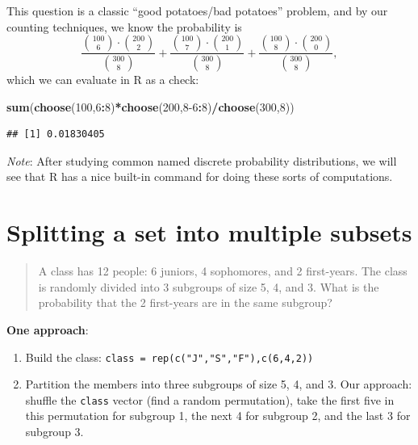 \documentclass[
]{book}
\newenvironment{Shaded}{\begin{snugshade}}{\end{snugshade}}
\newcommand{\DecValTok}[1]{\textcolor[rgb]{0.00,0.00,0.81}{#1}}
\newcommand{\FunctionTok}[1]{\textcolor[rgb]{0.13,0.29,0.53}{\textbf{#1}}}
\newcommand{\NormalTok}[1]{#1}
\newcommand{\SpecialCharTok}[1]{\textcolor[rgb]{0.81,0.36,0.00}{\textbf{#1}}}
\theoremstyle{definition}
\theoremstyle{definition}
\theoremstyle{definition}
\theoremstyle{definition}
\theoremstyle{remark}
\begin{document}
This question is a classic ``good potatoes/bad potatoes'' problem, and by our counting techniques, we know the probability is \[\frac{\binom{100}{6}\cdot\binom{200}{2}}{\binom{300}{8}}+
\frac{\binom{100}{7}\cdot\binom{200}{1}}{\binom{300}{8}}+
\frac{\binom{100}{8}\cdot\binom{200}{0}}{\binom{300}{8}},\]
which we can evaluate in R as a check:

\begin{Shaded}
\begin{Highlighting}[]
\FunctionTok{sum}\NormalTok{(}\FunctionTok{choose}\NormalTok{(}\DecValTok{100}\NormalTok{,}\DecValTok{6}\SpecialCharTok{:}\DecValTok{8}\NormalTok{)}\SpecialCharTok{*}\FunctionTok{choose}\NormalTok{(}\DecValTok{200}\NormalTok{,}\DecValTok{8{-}6}\SpecialCharTok{:}\DecValTok{8}\NormalTok{)}\SpecialCharTok{/}\FunctionTok{choose}\NormalTok{(}\DecValTok{300}\NormalTok{,}\DecValTok{8}\NormalTok{))}
\end{Highlighting}
\end{Shaded}

\begin{verbatim}
## [1] 0.01830405
\end{verbatim}

\emph{Note}: After studying common named discrete probability distributions, we will see that R has a nice built-in command for doing these sorts of computations.

\section{Splitting a set into multiple subsets}\label{partition-set-R}

\begin{quote}
A class has 12 people: 6 juniors, 4 sophomores, and 2 first-years. The class is randomly divided into 3 subgroups of size 5, 4, and 3. What is the probability that the 2 first-years are in the same subgroup?
\end{quote}

\textbf{One approach}:

\begin{enumerate}
\def\labelenumi{\arabic{enumi}.}
\item
  Build the class: \texttt{class\ =\ rep(c("J","S","F"),c(6,4,2))}
\item
  Partition the members into three subgroups of size 5, 4, and 3. Our approach: shuffle the \texttt{class} vector (find a random permutation), take the first five in this permutation for subgroup 1, the next 4 for subgroup 2, and the last 3 for subgroup 3.
\end{enumerate}
\end{document}
